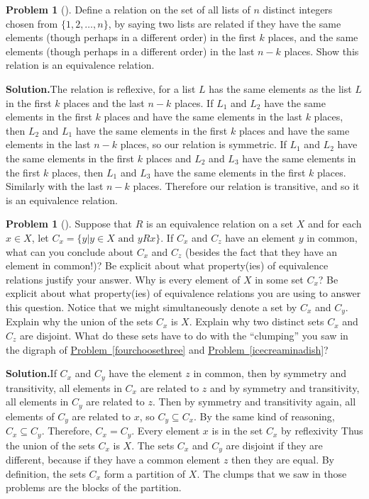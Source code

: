 \documentclass[10pt,]{book}
\theoremstyle{plain}
\theoremstyle{definition}
\newtheorem{activity}[project]{Problem}
\theoremstyle{definition}
\numberwithin{equation}{chapter}
\begin{document}
\begin{activity}[]\label{activity-351}
Define a relation on the set of all lists of \(n\) distinct integers chosen from \(\{1,2,\ldots, n\}\), by saying two lists are related if they have the same elements (though perhaps in a different order) in the first \(k\) places, and the same elements (though perhaps in a different order) in the last \(n-k\) places. Show this relation is an equivalence relation.%
\par\medskip\noindent%
\textbf{Solution.}\quad The relation is reflexive, for a list \(L\) has the same elements as the list \(L\) in the first \(k\) places and the last \(n-k\) places. If \(L_1\) and \(L_2\) have the same elements in the first \(k\) places and have the same elements in the last \(k\) places, then \(L_2\) and \(L_1\) have the same elements in the first \(k\) places and have the same elements in the last \(n-k\) places, so our relation is symmetric. If \(L_1\) and \(L_2\) have the same elements in the first \(k\) places and \(L_2\) and \(L_3\) have the same elements in the first \(k\) places, then \(L_1\) and \(L_3\) have the same elements in the first \(k\) places. Similarly with the last \(n-k\) places. Therefore our relation is transitive, and so it is an equivalence relation.%
\end{activity}
\begin{activity}[]\label{equivalenceclasses}
Suppose that \(R\) is an equivalence relation on a set \(X\) and for each \(x\in X\), let \(C_x = \{y| y\in X \mbox{ and }
yRx\}\). If \(C_x\) and \(C_z\) have an element \(y\) in common, what can you conclude about \(C_x\) and \(C_z\) (besides the fact that they have an element in common!)? Be explicit about what property(ies) of equivalence relations justify your answer. Why is every element of \(X\) in some set \(C_x\)? Be explicit about what property(ies) of equivalence relations you are using to answer this question. Notice that we might simultaneously denote a set by \(C_x\) and \(C_y\). Explain why the union of the sets \(C_x\) is \(X\). Explain why two distinct sets \(C_x\) and \(C_z\) are disjoint. What do these sets have to do with the ``clumping'' you saw in the digraph of \hyperref[fourchoosethree]{Problem~\ref{fourchoosethree}} and \hyperref[icecreaminadish]{Problem~\ref{icecreaminadish}}?%
\par\medskip\noindent%
\textbf{Solution.}\quad If \(C_x\) and \(C_y\) have the element \(z\) in common, then by symmetry and transitivity, all elements in \(C_x\) are related to \(z\) and by symmetry and transitivity, all elements in \(C_y\) are related to \(z\). Then by symmetry and transitivity again, all elements of \(C_y\) are related to \(x\), so \(C_y\subseteq C_x\). By the same kind of reasoning, \(C_x\subseteq C_y\). Therefore, \(C_x=C_y\). Every element \(x\) is in the set \(C_x\) by reflexivity Thus the union of the sets \(C_x\) is \(X\). The sets \(C_x\) and \(C_y\) are disjoint if they are different, because if they have a common element \(z\) then they are equal. By definition, the sets \(C_x\) form a partition of \(X\). The clumps that we saw in those problems are the blocks of the partition.%
\end{activity}
\end{document}
